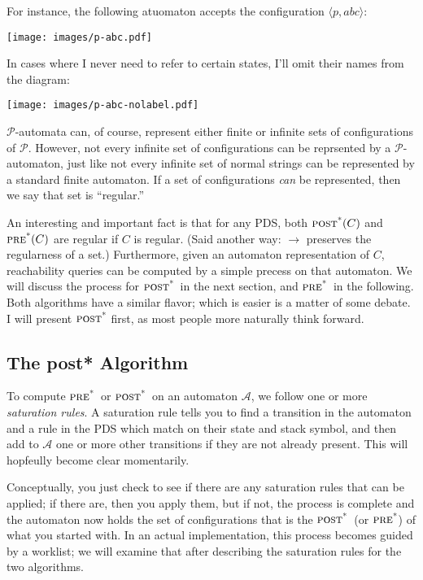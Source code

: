 \documentclass{article}
\newcommand{\Config}[2]{\ensuremath{\langle #1, #2 \rangle}}
\newcommand{\poststar}{\ensuremath{\textsc{post}^\textsc{*}}}
\newcommand{\prestar}{\ensuremath{\textsc{pre}^\textsc{*}}}
\begin{document}
For instance, the following atuomaton accepts the configuration
\Config{p}{abc}:\\
\begin{center}
  \texttt{[image: images/p-abc.pdf]}
\end{center}

In cases where I never need to refer to certain states, I'll omit
their names from the diagram:\\
\begin{center}
  \texttt{[image: images/p-abc-nolabel.pdf]}
\end{center}

$\mathcal{P}$-automata can, of course, represent either finite or
infinite sets of configurations of $\mathcal{P}$. However, not every
infinite set of configurations can be reprsented by a
$\mathcal{P}$-automaton, just like not every infinite set of normal
strings can be represented by a standard finite automaton. If a set of
configurations \emph{can} be represented, then we say that set is
``regular.''

An interesting and important fact is that for any PDS, both
$\poststar(C)$ and $\prestar(C)$ are regular if $C$ is regular. (Said
another way: $\rightarrow$ preserves the regularness of a set.)
Furthermore, given an automaton representation of $C$, reachability
queries can be computed by a simple precess on that automaton. We will
discuss the process for \poststar\ in the next section, and
\prestar\ in the following. Both algorithms have a similar flavor;
which is easier is a matter of some debate. I will present $\poststar$
first, as most people more naturally think forward.


\subsection{The post* Algorithm}

To compute \prestar\ or \poststar\ on an automaton $\mathcal{A}$, we
follow one or more \emph{saturation rules}. A saturation rule tells
you to find a transition in the automaton and a rule in the PDS which
match on their state and stack symbol, and then add to $\mathcal{A}$
one or more other transitions if they are not already present. This
will hopfeully become clear momentarily.

Conceptually, you just check to see if there are any saturation rules
that can be applied; if there are, then you apply them, but if not,
the process is complete and the automaton now holds the set of
configurations that is the \poststar\ (or \prestar) of what you
started with. In an actual implementation, this process becomes guided
by a worklist; we will examine that after describing the saturation
rules for the two algorithms.
\end{document}
